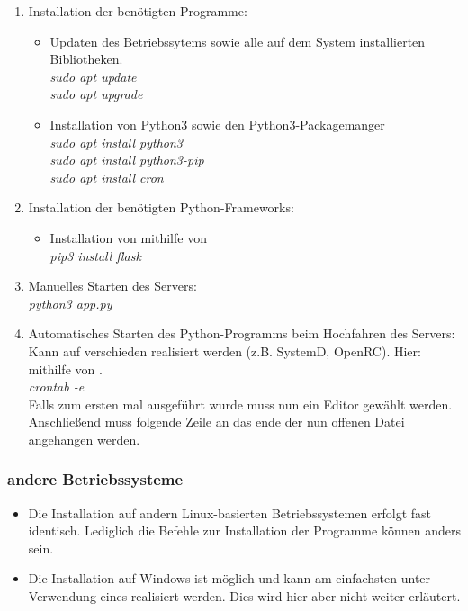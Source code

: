 \documentclass{article}
\begin{document}
\begin{enumerate}
    \item Installation der benötigten Programme: 
        \begin{itemize}
            \item Updaten des Betriebssytems sowie alle auf dem System 
                installierten Bibliotheken. \\
                \textit{sudo apt update} \\
                \textit{sudo apt upgrade}
            \item Installation von Python3 sowie den Python3-Packagemanger  \\
                \textit{sudo apt install python3} \\
                \textit{sudo apt install python3-pip}\\
                \textit{sudo apt install cron}
        \end{itemize}
    \item Installation der benötigten Python-Frameworks: 
        \begin{itemize}
            \item Installation von  mithilfe von  \\
                \textit{pip3 install flask}
        \end{itemize}
    \item Manuelles Starten des Servers: \\
        \textit{python3 app.py} 
    \item Automatisches Starten des Python-Programms beim Hochfahren des Servers: \\ 
        Kann auf verschieden realisiert werden (z.B. SystemD, OpenRC).
        Hier: mithilfe von .  \\
        \textit{crontab -e} \\ 
        Falls  zum ersten mal ausgeführt wurde muss nun ein Editor gewählt
        werden. Anschließend muss folgende Zeile an das ende der nun offenen Datei 
        angehangen werden. \\
\end{enumerate}
\subsubsection{andere Betriebssysteme}
\begin{itemize}
    \item Die Installation auf andern Linux-basierten Betriebssystemen erfolgt
        fast identisch. Lediglich die Befehle zur Installation
        der Programme können anders sein.
    \item Die Installation auf Windows ist möglich und kann am einfachsten 
        unter Verwendung eines  realisiert werden. Dies 
        wird hier aber nicht weiter erläutert.
\end{itemize}
\end{document}
